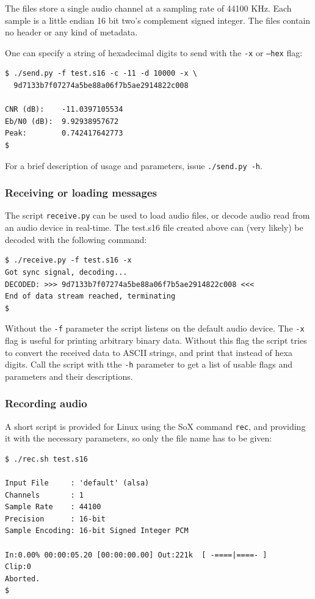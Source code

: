 \documentclass[a4paper]{article}
\begin{document}
The files store a single audio channel at a sampling rate of 44100 KHz. 
Each sample is a little endian 16 bit two's complement signed integer. 
The files contain no header or any kind of metadata.

One can specify a string of hexadecimal digits to send with the 
\texttt{-x} or \texttt{--hex} flag:

\begin{lstlisting}
$ ./send.py -f test.s16 -c -11 -d 10000 -x \
  9d7133b7f07274a5be88a06f7b5ae2914822c008

CNR (dB):    -11.0397105534
Eb/N0 (dB):  9.92938957672
Peak:        0.742417642773
$
\end{lstlisting}

For a brief description of usage and parameters, issue 
\texttt{./send.py -h}.

\subsubsection{Receiving or loading messages}

The script \texttt{receive.py} can be used to load audio files, or 
decode audio read from an audio device in real-time. The test.s16 file 
created above can (very likely) be decoded with the following 
command:

\begin{lstlisting}
$ ./receive.py -f test.s16 -x
Got sync signal, decoding... 
DECODED: >>> 9d7133b7f07274a5be88a06f7b5ae2914822c008 <<<
End of data stream reached, terminating
$
\end{lstlisting}

Without the \texttt{-f} parameter the script listens on the default 
audio device. The \texttt{-x} flag is useful for printing arbitrary 
binary data. Without this flag the script tries to convert the received 
data to ASCII strings, and print that instead of hexa digits. Call the 
script with tthe \texttt{-h} parameter to get a list of usable flags 
and parameters and their descriptions.

\subsubsection{Recording audio}

A short script is provided for Linux using the SoX command 
\texttt{rec}, and providing it with the necessary parameters, so only 
the file name has to be given:

\begin{lstlisting}
$ ./rec.sh test.s16

Input File     : 'default' (alsa)
Channels       : 1
Sample Rate    : 44100
Precision      : 16-bit
Sample Encoding: 16-bit Signed Integer PCM

In:0.00% 00:00:05.20 [00:00:00.00] Out:221k  [ -====|====- ]     Clip:0
Aborted.
$
\end{lstlisting}
\end{document}
